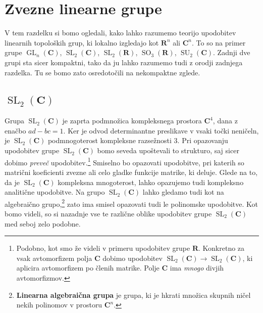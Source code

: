 \documentclass[11pt]{book}
\def\RR{\mathbf{R}}
\def\CC{\mathbf{C}}
\DeclareMathOperator\SU{SU}
\DeclareMathOperator\GL{GL}
\DeclareMathOperator\SL{SL}
\DeclareMathOperator\SO{SO}
\def\definicija{\color{rdeca}\bf}
\theoremstyle{definition}
\theoremstyle{zgled}
\theoremstyle{zgledbrezstevilke}
\theoremstyle{odprtproblem}
\theoremstyle{domacanaloga}
\theoremstyle{izrek}
\begin{document}

\section{Zvezne linearne grupe}

V tem razdelku si bomo ogledali, kako lahko razumemo teorijo upodobitev linearnih topoloških grup, ki lokalno izgledajo kot $\RR^n$ ali $\CC^n$. To so na primer grupe $\GL_n(\CC)$, $\SL_2(\CC)$, $\SL_2(\RR)$, $\SO_3(\RR)$, $\SU_2(\CC)$. Zadnji dve grupi sta sicer kompaktni, tako da ju lahko razumemo tudi z orodji zadnjega razdelka. Tu se bomo zato osredotočili na nekompaktne zglede.

\subsection{$\SL_2(\CC)$}

Grupa $\SL_2(\CC)$ je zaprta podmnožica kompleksnega prostora $\CC^4$, dana z enačbo $ad - bc = 1$. Ker je odvod determinantne preslikave v vsaki točki neničeln, je $\SL_2(\CC)$ podmnogoterost kompleksne razsežnosti $3$. Pri opazovanju upodobitev grupe $\SL_2(\CC)$ bomo seveda upoštevali to strukturo, saj sicer dobimo \emph{preveč} upodobitev.\footnote{Podobno, kot smo že videli v primeru upodobitev grupe $\RR$. Konkretno za vsak avtomorfizem polja $\CC$ dobimo upodobitev $\SL_2(\CC) \to \SL_2(\CC)$, ki aplicira avtomorfizem po členih matrike. Polje $\CC$ ima \emph{mnogo} divjih avtomorfizmov.} Smiselno bo opazovati upodobitve, pri katerih so matrični koeficienti zvezne ali celo gladke funkcije matrike, ki deluje. Glede na to, da je $\SL_2(\CC)$ kompleksna mnogoterost, lahko opazujemo tudi kompleksno analitične upodobitve. Na grupo $\SL_2(\CC)$ lahko gledamo tudi kot na algebraično grupo,\footnote{{\definicija Linearna algebraična grupa} je grupa, ki je hkrati množica skupnih ničel nekih polinomov v prostoru $\CC^n$.} zato ima smisel opazovati tudi le polinomske upodobitve. Kot bomo videli, so si nazadnje vse te različne oblike upodobitev grupe $\SL_2(\CC)$ med seboj zelo podobne.
\end{document}
